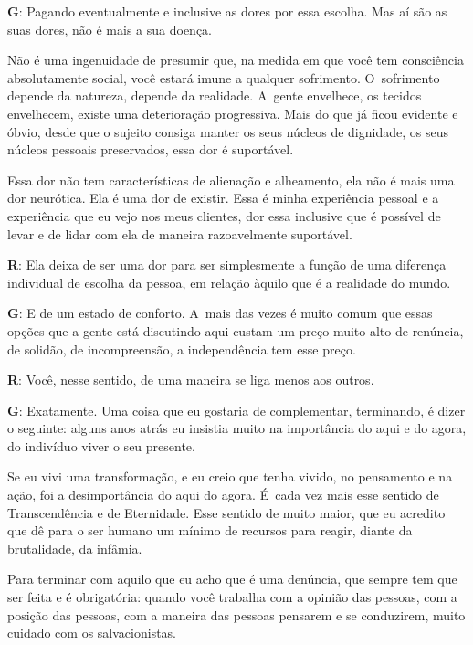  

\textbf{G}: Pagando eventualmente e inclusive as dores por essa escolha.
Mas aí são as suas dores, não é mais a sua doença.

 

Não é uma ingenuidade de presumir que, na medida em que você tem
consciência absolutamente social, você estará imune a qualquer
sofrimento. O~sofrimento depende da natureza, depende da realidade. A~gente envelhece, os tecidos envelhecem, existe uma deterioração
progressiva. Mais do que já ficou evidente e óbvio, desde que o
sujeito consiga manter os seus núcleos de dignidade, os seus núcleos
pessoais preservados, essa dor é suportável.

 

Essa dor não tem características de alienação e alheamento, ela não é
mais uma dor neurótica. Ela é uma dor de existir. Essa é minha
experiência pessoal e a experiência que eu vejo nos meus clientes, dor
essa inclusive que é possível de levar e de lidar com ela de maneira
razoavelmente suportável.

 

\textbf{R}: Ela deixa de ser uma dor para ser simplesmente a função de
uma diferença individual de escolha da pessoa, em relação àquilo que é a
realidade do mundo.

 

\textbf{G}: E de um estado de conforto. A~mais das vezes é muito comum
que essas opções que a gente está discutindo aqui custam um preço muito
alto de renúncia, de solidão, de incompreensão, a independência tem esse
preço.

 

\textbf{R}: Você, nesse sentido, de uma maneira se liga menos aos outros.

 

\textbf{G}: Exatamente. Uma coisa que eu gostaria de complementar,
terminando, é dizer o seguinte: alguns anos atrás eu insistia muito na
importância do aqui e do agora, do indivíduo viver o seu presente.

 

Se eu vivi uma transformação, e eu creio que tenha vivido, no pensamento
e na ação, foi a desimportância do aqui do agora. É~cada vez mais esse
sentido de Transcendência e de Eternidade. Esse sentido de muito 
maior, que eu acredito que dê para o ser humano um mínimo de recursos
para reagir, diante da brutalidade, da infâmia.

 

Para terminar com aquilo que eu acho que é uma denúncia, que sempre tem
que ser feita e é obrigatória: quando você trabalha com a opinião das
pessoas, com a posição das pessoas, com a maneira das pessoas pensarem e
se conduzirem, muito cuidado com os salvacionistas.

